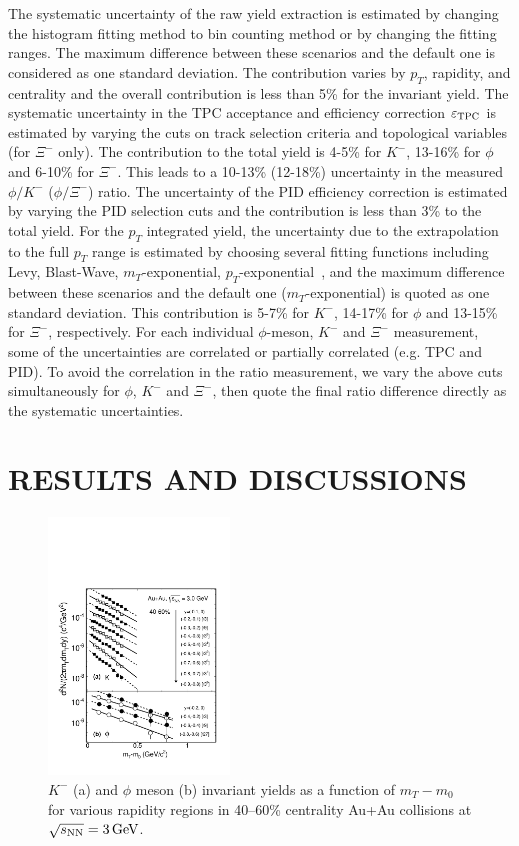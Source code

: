 \documentclass[aps,tightenlines,superscriptaddress,twocolumn]{revtex4-1}
\begin{document}
The systematic uncertainty of the raw yield extraction is estimated by changing the histogram fitting method to bin counting method or by changing the fitting ranges. The maximum difference between these scenarios and the default one is considered as one standard deviation. The contribution varies by $p_T$, rapidity, and centrality and the overall contribution is less than 5\% for the invariant yield. The systematic uncertainty in the TPC acceptance and efficiency correction $\varepsilon_{\rm TPC}$ is estimated by varying the cuts on track selection criteria and topological variables (for $\Xi^-$ only). The contribution to the total yield is 4-5\% for $K^-$, 13-16\% for $\phi$ and 6-10\% for $\Xi^-$. This leads to a 10-13\% (12-18\%) uncertainty in the measured $\phi/K^-$ ($\phi/\Xi^-$) ratio. The uncertainty of the PID efficiency correction is estimated by varying the PID selection cuts and the contribution is less than 3\% to the total yield.
For the $p_T$ integrated yield, the uncertainty due to the extrapolation to the full $p_T$ range is estimated by choosing several fitting functions including Levy, Blast-Wave, $m_T$-exponential, $p_T$-exponential~\cite{STAR_particleYield:2009}, and the maximum difference between these scenarios and the default one ($m_T$-exponential) is quoted as one standard deviation. This contribution is 5-7\% for $K^-$, 14-17\% for $\phi$ and 13-15\% for $\Xi^-$, respectively. For each individual $\phi$-meson, $K^-$ and $\Xi^-$ measurement, some of the uncertainties are correlated or partially correlated (e.g. TPC and PID). To avoid the correlation in the ratio measurement, we vary the above cuts simultaneously for $\phi$, $K^-$ and $\Xi^-$, then quote the final ratio difference directly as the systematic uncertainties.


\section{RESULTS AND DISCUSSIONS}
\label{results}


\begin{figure}
\centering
\hspace*{-10mm}
\includegraphics[width=0.43\textwidth]{fig23-eps-converted-to.pdf}
\caption{$K^-$ (a) and $\phi$ meson (b) invariant yields as a function of $m_T-m_0$ for various rapidity regions in 40--60\% centrality Au+Au collisions at ${\sqrt{s_{\rm NN}} = \rm{3\,GeV}}$.}
\label{fig:phimTSpectra23}
\end{figure}
\end{document}
